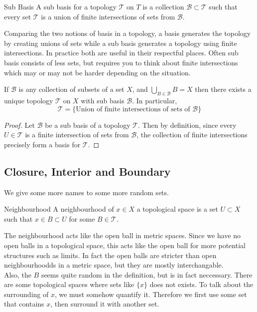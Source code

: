 \documentclass[a4paper]{article}
\begin{document}
\begin{defn}{Sub Basis}{} A sub basis for a topology $\mathcal{T}$ on $T$ is a collection $\mathcal{B}\subset\mathcal{T}$ such that every set $\mathcal{T}$ is a union of finite intersections of sets from $\mathcal{B}$. 
\end{defn}

Comparing the two notions of basis in a topology, a basis generates the topology by creating unions of sets while a sub basis generates a topology using finite intersections. In practice both are useful in their respectful places. Often sub basis consists of less sets, but requires you to think about finite intersections which may or may not be harder depending on the situation. 

\begin{prp}{}{} If $\mathcal{B}$ is any collection of subsets of a set $X$, and $\bigcup_{B\in\mathcal{B}}B=X$ then there exists a unique topology $\mathcal{T}$ on $X$ with sub basis $\mathcal{B}$. In particular, $$\mathcal{T}=\{\text{Union of finite intersections of sets of }\mathcal{B}\}$$ 
\begin{proof}
Let $\mathcal{B}$ be a sub basis of a topology $\mathcal{T}$. Then by definition, since every $U\in\mathcal{T}$ is a finite intersection of sets from $\mathcal{B}$, the collection of finite intersections precisely form a basis for $\mathcal{T}$. 
\end{proof}
\end{prp}

\subsection{Closure, Interior and Boundary}
We give some more names to some more random sets. 
\begin{defn}{Neighbourhood}{} A neighbourhood of $x\in X$ a topological space is a set $U\subset X$ such that $x\in B\subset U$ for some $B\in\mathcal{T}$. 
\end{defn}

The neighbourhood acts like the open ball in metric spaces. Since we have no open balls in a topological space, this acts like the open ball for more potential structures such as limits. In fact the open balls are stricter than open neighbourhoodds in a metric space, but they are mostly interchangable. \\
Also, the $B$ seems quite random in the definition, but is in fact neccessary. There are some topological spaces where sets like $\{x\}$ does not exists. To talk about the surrounding of $x$, we must somehow quantify it. Therefore we first use some set that contains $x$, then surround it with another set. \\
\end{document}
